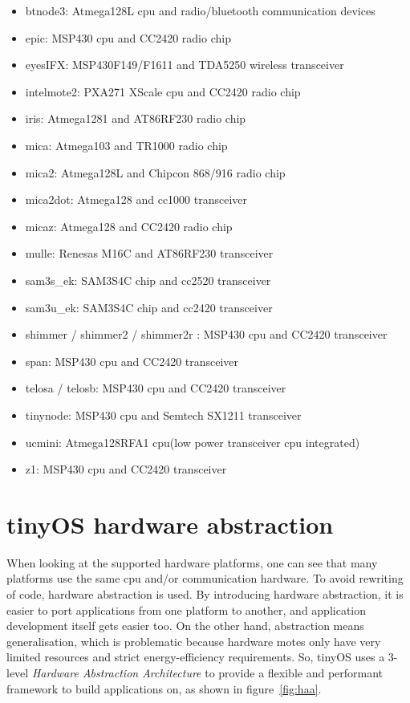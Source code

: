 \begin{itemize}
 \item btnode3: Atmega128L cpu and radio/bluetooth communication devices
 \item epic: MSP430 cpu and CC2420 radio chip
 \item eyesIFX: MSP430F149/F1611 and TDA5250 wireless transceiver
 \item intelmote2: PXA271 XScale cpu and CC2420 radio chip 
 \item iris: Atmega1281 and AT86RF230 radio chip
 \item mica: Atmega103 and TR1000 radio chip
 \item mica2: Atmega128L and Chipcon 868/916 radio chip
 \item mica2dot: Atmega128 and cc1000 transceiver
 \item micaz: Atmega128 and CC2420 radio chip
 \item mulle: Renesas M16C and AT86RF230 transceiver
 \item sam3s\_ek: SAM3S4C chip and cc2520 transceiver
 \item sam3u\_ek: SAM3S4C chip and cc2420 transceiver
 \item shimmer / shimmer2 / shimmer2r : MSP430 cpu and CC2420 transceiver
 \item span: MSP430 cpu and CC2420 transceiver
 \item telosa / telosb: MSP430 cpu and CC2420 transceiver
 \item tinynode: MSP430 cpu and Semtech SX1211 transceiver
 \item ucmini: Atmega128RFA1 cpu(low power transceiver cpu integrated)
 \item z1: MSP430 cpu and CC2420 transceiver
\end{itemize}

\section{tinyOS hardware abstraction}

When looking at the supported hardware platforms, one can see that many platforms use the same cpu and/or communication hardware. To avoid rewriting of code, hardware abstraction is used.
By introducing hardware abstraction, it is easier to port applications from one platform to another, and application development itself gets easier too. On the other hand, abstraction means generalisation, which is problematic because hardware motes only have very limited resources and strict energy-efficiency requirements.
So, tinyOS uses a 3-level \textit{Hardware Abstraction Architecture} to provide a flexible and performant framework to build applications on, as shown in figure~\ref{fig:haa}.

